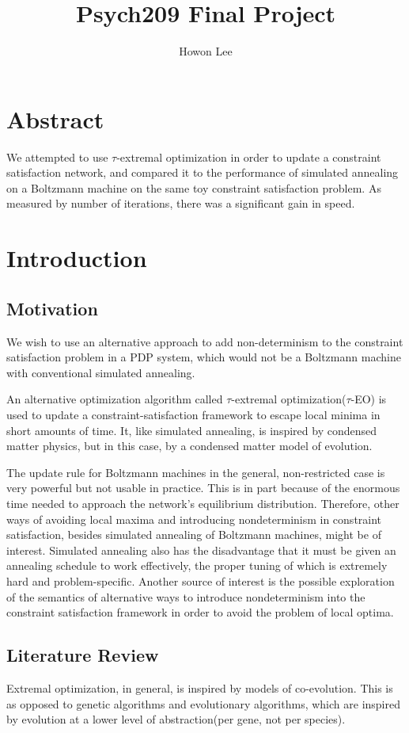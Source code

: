\documentclass[12pt]{article}
\begin{document}
\title{Psych209 Final Project}
\author{Howon Lee}
\maketitle
\section*{Abstract}
We attempted to use $\tau$-extremal optimization in order to update a constraint satisfaction network, and compared it to the performance of simulated annealing on a Boltzmann machine on the same toy constraint satisfaction problem. As measured by number of iterations, there was a significant gain in speed.
\section*{Introduction}
\subsection*{Motivation}

We wish to use an alternative approach to add non-determinism to the constraint satisfaction problem in a PDP system, which would not be a Boltzmann machine with conventional simulated annealing.

An alternative optimization algorithm called $\tau$-extremal optimization($\tau$-EO) is used to update a constraint-satisfaction framework to escape local minima in short amounts of time. It, like simulated annealing, is inspired by condensed matter physics, but in this case, by a condensed matter model of evolution.

The update rule for Boltzmann machines in the general, non-restricted case is very powerful but not usable in practice. This is in part because of the enormous time needed to approach the network's equilibrium distribution. Therefore, other ways of avoiding local maxima and introducing nondeterminism in constraint satisfaction, besides simulated annealing of Boltzmann machines, might be of interest. Simulated annealing also has the disadvantage that it must be given an annealing schedule to work effectively, the proper tuning of which is extremely hard and problem-specific. Another source of interest is the possible exploration of the semantics of alternative ways to introduce nondeterminism into the constraint satisfaction framework in order to avoid the problem of local optima.

\subsection*{Literature Review}
Extremal optimization, in general, is inspired by models of co-evolution. This is as opposed to genetic algorithms and evolutionary algorithms, which are inspired by evolution at a lower level of abstraction(per gene, not per species).
\end{document}
